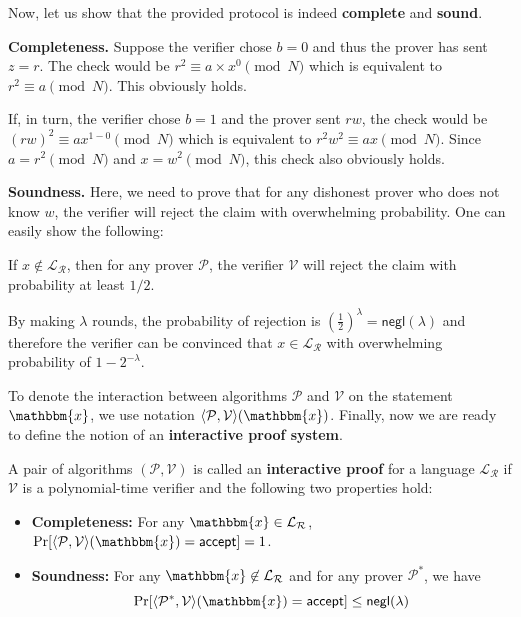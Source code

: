 \documentclass[../../book.tex]{subfiles}
\begin{document}
Now, let us show that the provided protocol is indeed \textbf{complete} and \textbf{sound}.

\textbf{Completeness.} Suppose the verifier chose $b=0$ and thus the prover has sent $z=r$. The check would be $r^2 \equiv a\times x^{0} \pmod{N}$ which is equivalent to $r^2 \equiv a \pmod{N}$. This obviously holds. 

If, in turn, the verifier chose $b=1$ and the prover sent $rw$, the check would be $(rw)^2 \equiv ax^{1-0} \pmod{N}$ which is equivalent to $r^2w^2 \equiv ax \pmod{N}$. Since $a = r^2 \pmod{N}$ and $x = w^2 \pmod{N}$, this check also obviously holds.

\textbf{Soundness.} Here, we need to prove that for any dishonest prover who
does not know $w$, the verifier will reject the claim with overwhelming
probability. One can easily show the following:

\begin{proposition}
    If $x \not\in \mathcal{L}_{\mathcal{R}}$, then for any prover $\mathcal{P}$, the verifier $\mathcal{V}$ will reject the claim with probability at least $1/2$.
\end{proposition}

By making $\lambda$ rounds, the probability of rejection is $\left(\frac{1}{2}\right)^{\lambda} = \mathsf{negl}(\lambda)$ and therefore the verifier can be convinced that $x \in \mathcal{L}_{\mathcal{R}}$ with overwhelming probability of $1-2^{-\lambda}$.

To denote the interaction between algorithms $\mathcal{P}$ and $\mathcal{V}$ on
the statement $\mathbbm{x}$, we use notation $\langle \mathcal{P}, \mathcal{V}
\rangle(\mathbbm{x})$. Finally, now we are ready to define the notion of an
\textbf{interactive proof system}.

\begin{definition}
    A pair of algorithms $(\mathcal{P},\mathcal{V})$ is called an
    \textbf{interactive proof} for a language $\mathcal{L}_{\mathcal{R}}$ if
    $\mathcal{V}$ is a polynomial-time verifier and the following two properties
    hold:
    \begin{itemize}
        \item \textbf{Completeness:} For any $\mathbbm{x} \in
        \mathcal{L}_{\mathcal{R}}$, $\text{Pr}[\langle \mathcal{P}, \mathcal{V}
        \rangle(\mathbbm{x}) = \mathsf{accept}]=1$.
        \item \textbf{Soundness:} For any $\mathbbm{x} \not\in
        \mathcal{L}_{\mathcal{R}}$ and for any prover $\mathcal{P}^*$, we have 
        \begin{equation*}
            \text{Pr}[\langle \mathcal{P}^*, \mathcal{V} \rangle(\mathbbm{x}) = \mathsf{accept}] \leq \mathsf{negl}(\lambda)
        \end{equation*}
    \end{itemize}
\end{definition}
\end{document}
